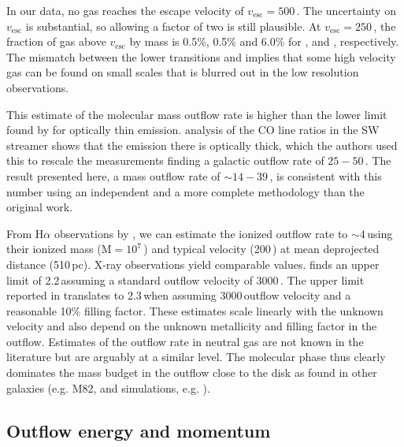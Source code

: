 In our data, no gas reaches the escape velocity of $v_\mathrm{esc} = 500$\,\kms \citep{2017ApJ...835..265W}. The uncertainty on $v_\mathrm{esc}$ is substantial, so allowing a factor of two is still plausible. At $v_\mathrm{esc} = 250$\,\kms, the fraction of gas above $v_\mathrm{esc}$ by mass is 0.5\%, 0.5\% and 6.0\% for ,  and , respectively. The mismatch between the lower transitions and  implies that some high velocity gas can be found on small scales that is blurred out in the low resolution observations.

This estimate of the molecular mass outflow rate is higher than the lower limit found by \citet{2013Natur.499..450B} for optically thin emission. \citet{2018ApJ...867..111Z} analysis of the CO line ratios in the SW streamer shows that the emission there is optically thick, which the authors used this to rescale the \citet{2013Natur.499..450B} measurements finding a  galactic outflow rate of $25-50$\,\Msunyr. The result presented here, a mass outflow rate of $\sim 14-39$\,\Msunyr, is consistent with this number using an independent and a more complete methodology than the original work.

From H$\alpha$ observations by \citet{Westmoquette:2011bp}, we can estimate the ionized outflow rate to $\sim 4$\,\Msunyr using their ionized mass ($\mathrm{M} = 10^7$\,\Msun) and typical velocity (200\,\kms) at mean deprojected distance (510\,pc). X-ray observations yield comparable values. \citet{Strickland:2000wd} finds an upper limit of 2.2\,\Msunyr assuming a standard outflow velocity of 3000\,\kms. The upper limit reported in \citet{Strickland:2002kp} translates to 2.3\,\Msunyr when assuming 3000\,\kms outflow velocity and a reasonable 10\% filling factor. These estimates scale linearly with the unknown velocity and also depend on the unknown metallicity and filling factor in the outflow. Estimates of the outflow rate in neutral gas are not known in the literature but are arguably at a similar level.
The molecular phase thus clearly dominates the mass budget in the outflow close to the disk as found in other galaxies (e.g. M82, \citealt{2015ApJ...814...83L} and simulations, e.g. \citealt{2018ApJ...853..173K}).



\subsection{Outflow energy and momentum}
\label{outflow: section: outflow energy}

